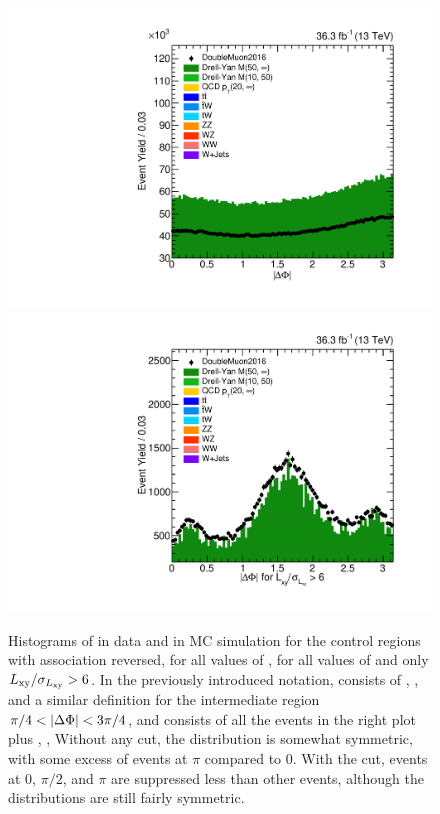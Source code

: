 \begin{figure}[htbp]
  \centering
  \includegraphics[width=\DSquareWidth]{figures/displaced/BGEST_NOPAT_deltaPhi_Lin.pdf}
  \hspace*{-2em}
  \includegraphics[width=\DSquareWidth]{figures/displaced/BGEST_NOPAT_deltaPhi-Big_Lin.pdf}
  \caption[Histograms of \DeltaPhi in data and in MC simulation for the control regions with \DSAToPAT association reversed, for all values of \DeltaPhi, for all values of \LxySig and for $\LxySig > 6$.]{Histograms of \DeltaPhi in data and in MC simulation for the control regions with \DSAToPAT association reversed, for all values of \DeltaPhi, for  all values of \LxySig and  only $\LxySig > 6$. In the previously introduced notation,  consists of , , and a similar definition for the intermediate region $\pi/4 < |\Delta\Phi| < 3\pi/4$, and  consists of all the events in the right plot plus , , \etc Without any \LxySig cut, the distribution is somewhat symmetric, with some excess of events at $\pi$ compared to 0. With the \LxySig cut, events at 0, $\pi/2$, and $\pi$ are suppressed less than other events, although the distributions are still fairly symmetric.}
  \label{fig:dd:BGDeltaPhi_NoPAT}
\end{figure}

